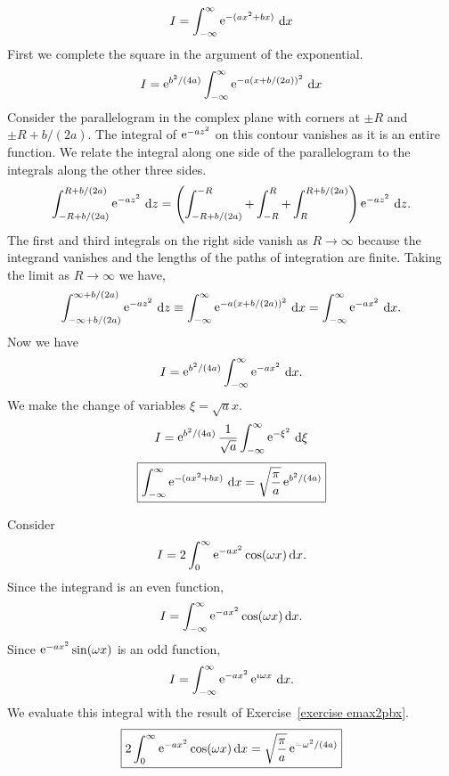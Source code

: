 {%
\begin{Solution}
  \label{solution emax2pbx}
  \[ 
  I = \int_{-\infty}^\infty \mathop{\mathrm{e}}\nolimits^{-(a x^2 + b x)} \,\mathrm{d} x 
  \]
  First we complete the square in the argument of the exponential.
  \[ 
  I = \mathop{\mathrm{e}}\nolimits^{b^2 / (4 a)} \int_{-\infty}^\infty \mathop{\mathrm{e}}\nolimits^{- a (x + b / (2 a))^2 } \,\mathrm{d} x 
  \]
  Consider the parallelogram in the complex plane with corners at $\pm R$ and
  $\pm R + b/(2 a)$.  The integral of $\mathop{\mathrm{e}}\nolimits^{-a z^2}$ on this contour vanishes
  as it is an entire function.  We relate the integral along one side of 
  the parallelogram to the integrals along the other three sides.
  \[
  \int_{-R + b/(2 a)}^{R + b/(2 a)} \mathop{\mathrm{e}}\nolimits^{-a z^2} \,\mathrm{d} z
  = \left( \int_{-R + b/(2 a)}^{-R} + \int_{-R}^R + \int_R^{R + b/(2 a)} \right) \mathop{\mathrm{e}}\nolimits^{-a z^2} \,\mathrm{d} z.
  \]
  The first and third integrals on the right side vanish as $R \to \infty$
  because the integrand vanishes and the lengths of the paths of integration 
  are finite.  Taking the limit as $R \to \infty$ we have,
  \[
  \int_{-\infty + b/(2 a)}^{\infty + b/(2 a)} \mathop{\mathrm{e}}\nolimits^{-a z^2} \,\mathrm{d} z
  \equiv \int_{-\infty}^\infty \mathop{\mathrm{e}}\nolimits^{-a (x + b / (2 a))^2 } \,\mathrm{d} x 
  = \int_{-\infty}^\infty \mathop{\mathrm{e}}\nolimits^{-a x^2} \,\mathrm{d} x.
  \]
  Now we have
  \[ 
  I = \mathop{\mathrm{e}}\nolimits^{b^2 / (4 a)} \int_{-\infty}^\infty \mathop{\mathrm{e}}\nolimits^{-a x^2 } \,\mathrm{d} x.
  \]
  We make the change of variables $\xi = \sqrt{a} x$.
  \[ 
  I = \mathop{\mathrm{e}}\nolimits^{b^2 / (4 a)} \frac{1}{\sqrt{a}} \int_{-\infty}^\infty \mathop{\mathrm{e}}\nolimits^{- \xi^2 } \,\mathrm{d} \xi
  \]
  \[ 
  \boxed{
    \int_{-\infty}^\infty \mathop{\mathrm{e}}\nolimits^{-(a x^2 + b x)} \,\mathrm{d} x = \sqrt{ \frac{\pi}{a} } \mathop{\mathrm{e}}\nolimits^{b^2 / (4 a)} 
    }
  \]
\end{Solution}









\begin{Solution}
  \label{solution 2 int zi eax2 coswx dx}
  Consider
  \[
  I = 2 \int_0^\infty \mathop{\mathrm{e}}\nolimits^{-a x^2} \cos(\omega x)\,\mathrm{d} x.
  \]
  Since the integrand is an even function,
  \[
  I = \int_{-\infty}^\infty \mathop{\mathrm{e}}\nolimits^{-a x^2} \cos(\omega x)\,\mathrm{d} x.
  \]
  Since $\mathop{\mathrm{e}}\nolimits^{-a x^2} \sin(\omega x)$ is an odd function,
  \[
  I = \int_{-\infty}^\infty \mathop{\mathrm{e}}\nolimits^{-a x^2} \mathop{\mathrm{e}}\nolimits^{\imath \omega x} \,\mathrm{d} x.
  \]
  We evaluate this integral with the result of 
  Exercise~\ref{exercise emax2pbx}.
  \[
  \boxed{
    2 \int_0^\infty \mathop{\mathrm{e}}\nolimits^{-a x^2} \cos(\omega x)\,\mathrm{d} x = \sqrt{ \frac{\pi}{a} }
    \mathop{\mathrm{e}}\nolimits^{- \omega^2 / (4 a) }
    }
  \]


\end{Solution}}
